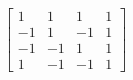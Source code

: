 \documentclass[preview]{standalone}
\begin{document}
	\begin{equation}
		\begin{bmatrix}
			1 & 1 & 1 & 1 \\
			-1 & 1 & -1 & 1 \\
			-1 & -1 & 1 & 1 \\
			1 & -1 & -1 & 1
	  \end{bmatrix}
	\end{equation}
\end{document}

